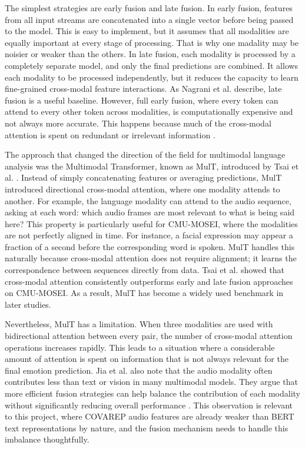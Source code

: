 The simplest strategies are early fusion and late fusion. In early fusion, features from all input streams are concatenated into a single vector before being passed to the model.  This is easy to implement, but it assumes that all modalities are equally important at every stage of processing. That is why one madality may be noisier or weaker than the others. In late fusion, each modality is processed by a completely separate model, and only the final predictions are combined. It allows each modality to be processed independently, but it reduces the capacity to learn fine-grained cross-modal feature interactions. As Nagrani et al. describe, late fusion is a useful baseline. However, full early fusion, where every token can attend to every other token across modalities, is computationally expensive and not always more accurate. This happens because much of the cross-modal attention is spent on redundant or irrelevant information \cite{nagrani2021attention}.

The approach that changed the direction of the field for multimodal language analysis was the Multimodal Transformer, known as MulT, introduced by Tsai et al. \cite{tsai2019multimodal}. Instead of simply concatenating features or averaging predictions, MulT introduced directional cross-modal attention, where one modality attends to another. For example, the language modality can attend to the audio sequence, asking at each word: which audio frames are most relevant to what is being said here? This property is particularly useful for CMU-MOSEI, where the modalities are not perfectly aligned in time. For instance, a facial expression may appear a fraction of a second before the corresponding word is spoken.  MulT handles this naturally because cross-modal attention does not require alignment; it learns the correspondence between sequences directly from data. Tsai et al. showed that cross-modal attention consistently outperforms early and late fusion approaches on CMU-MOSEI. As a result, MulT has become a widely used benchmark in later studies.

Nevertheless, MulT has a limitation. When three modalities are used with bidirectional attention between every pair, the number of cross-modal attention operations increases rapidly. This leads to a situation where a considerable amount of attention is spent on information that is not always relevant for the final emotion prediction. Jia et al. also note that the audio modality often contributes less than text or vision in many multimodal models. They argue that more efficient fusion strategies can help balance the contribution of each modality without significantly reducing overall performance \cite{jia2024efficient}. This observation is relevant to this project, where COVAREP audio features are already weaker than BERT text representations by nature, and the fusion mechanism needs to handle this imbalance thoughtfully.

